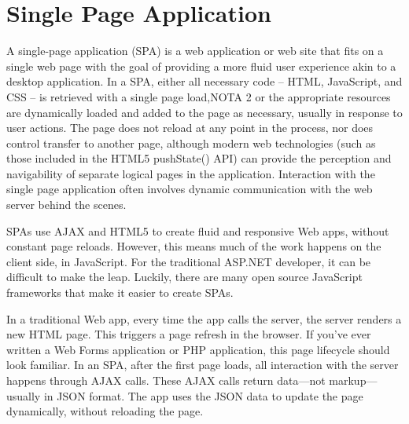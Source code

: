 \section{Single Page Application}
\label{sec:ARC_overview}

A single-page application (SPA) is a web application or web site that fits on a single web page with the goal of providing a more fluid user experience akin to a desktop application. In a SPA, either all necessary code – HTML, JavaScript, and CSS – is retrieved with a single page load,NOTA 2 or the appropriate resources are dynamically loaded and added to the page as necessary, usually in response to user actions. The page does not reload at any point in the process, nor does control transfer to another page, although modern web technologies (such as those included in the HTML5 pushState() API) can provide the perception and navigability of separate logical pages in the application. Interaction with the single page application often involves dynamic communication with the web server behind the scenes.

SPAs use AJAX and HTML5 to create fluid and responsive Web apps, without constant page reloads. However, this means much of the work happens on the client side, in JavaScript. For the traditional ASP.NET developer, it can be difficult to make the leap. Luckily, there are many open source JavaScript frameworks that make it easier to create SPAs.

In a traditional Web app, every time the app calls the server, the server renders a new HTML page. This triggers a page refresh in the browser. If you’ve ever written a Web Forms application or PHP application, this page lifecycle should look familiar.
In an SPA, after the first page loads, all interaction with the server happens through AJAX calls. These AJAX calls return data—not markup—usually in JSON format. The app uses the JSON data to update the page dynamically, without reloading the page.

